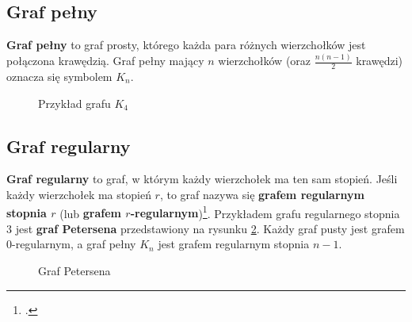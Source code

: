 \subsection*{Graf pełny}

\textbf{Graf pełny} to graf prosty, którego każda para różnych wierzchołków jest połączona krawędzią. Graf pełny mający $n$ wierzchołków (oraz $\frac{n(n-1)}{2}$ krawędzi) oznacza się symbolem $K_n$. 

\begin{figure}[h]
\centering
{}
\captionsetup{justification=centering}
\caption{Przykład grafu $K_4$} \label{fig:complete-graph-example}
\end{figure}

\subsection*{Graf regularny}

\textbf{Graf regularny} to graf, w którym każdy wierzchołek ma ten sam stopień. Jeśli każdy wierzchołek ma stopień $r$, to graf nazywa się \textbf{grafem regularnym stopnia $r$} (lub \textbf{grafem $r$-regularnym})\footcite[31]{wilson}. Przykładem grafu regularnego stopnia 3 jest \textbf{graf Petersena} przedstawiony na rysunku \ref{fig:petersen-graph}. Każdy graf pusty jest grafem $0$-regularnym, a graf pełny $K_n$ jest grafem regularnym stopnia $n-1$. 

\begin{figure}[h]
\centering
{}
\captionsetup{justification=centering}
\caption{Graf Petersena} \label{fig:petersen-graph}
\end{figure}


